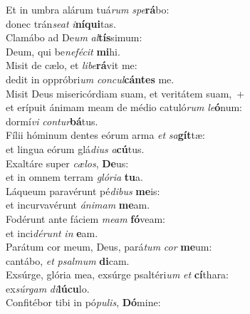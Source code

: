 \evenverse Et in umbra alárum tuá\textit{rum} \textit{spe}\textbf{rá}bo:~\*\\
\evenverse donec trán\textit{se}\textit{at} \textit{i}\textbf{ní}\textbf{qui}tas.\\
\oddverse Clamábo ad De\textit{um} \textit{al}\textbf{tís}simum:~\*\\
\oddverse Deum, qui be\textit{ne}\textit{fé}\textit{cit} \textbf{mi}hi.\\
\evenverse Misit de cælo, et \textit{li}\textit{be}\textbf{rá}vit me:~\*\\
\evenverse dedit in oppróbri\textit{um} \textit{con}\textit{cul}\textbf{cán}\textbf{tes} me.\\
\oddverse Misit Deus misericórdiam suam, et veritátem suam,~+\\
\oddverse  et erípuit ánimam meam de médio catuló\textit{rum} \textit{le}\textbf{ó}num:~\*\\
\oddverse dormí\textit{vi} \textit{con}\textit{tur}\textbf{bá}tus.\\
\evenverse Fílii hóminum dentes eórum arma \textit{et} \textit{sa}\textbf{gít}tæ:~\*\\
\evenverse et lingua eórum glá\textit{di}\textit{us} \textit{a}\textbf{cú}tus.\\
\oddverse Exaltáre super \textit{cæ}\textit{los}, \textbf{De}us:~\*\\
\oddverse et in omnem terram \textit{gló}\textit{ri}\textit{a} \textbf{tu}a.\\
\evenverse Láqueum paravérunt pé\textit{di}\textit{bus} \textbf{me}is:~\*\\
\evenverse et incurvavérunt \textit{á}\textit{ni}\textit{mam} \textbf{me}am.\\
\oddverse Fodérunt ante fáciem \textit{me}\textit{am} \textbf{fó}veam:~\*\\
\oddverse et inci\textit{dé}\textit{runt} \textit{in} \textbf{e}am.\\
\evenverse Parátum cor meum, Deus, pará\textit{tum} \textit{cor} \textbf{me}um:~\*\\
\evenverse cantábo, \textit{et} \textit{psal}\textit{mum} \textbf{di}cam.\\
\oddverse Exsúrge, glória mea, exsúrge psaltéri\textit{um} \textit{et} \textbf{cí}thara:~\*\\
\oddverse ex\textit{súr}\textit{gam} \textit{di}\textbf{lú}\textbf{cu}lo.\\
\evenverse Confitébor tibi in pó\textit{pu}\textit{lis}, \textbf{Dó}mine:~\*\\
